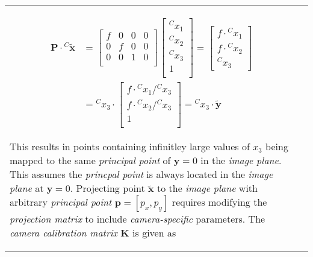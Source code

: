 \begin{longtable}{l p{12cm} }
{\begin{itemize}
\begin{itemize}
 
\begin{equation*}
\begin{split}
\mathbf{P}\cdot{^{C}\mathbf{\tilde{x}}}&=
\begin{bmatrix}
f & 0 & 0 & 0\\
0 & f & 0 & 0\\
0 & 0 & 1 & 0\\
\end{bmatrix}\left[\begin{array}{c}{^Cx_1}\\{^Cx_2}\\{^Cx_3}\\1\\\end{array}\right]
=\left[\begin{array}{c}
f\cdot {^Cx_1}\\
f\cdot {^Cx_2}\\
{^Cx_3}
\end{array}\right]\\
&=
{^Cx_3}\cdot\begin{bmatrix}
f\cdot{^Cx_1}/{^Cx_3}\\
f\cdot{^Cx_2}/{^Cx_3}\\
1\\
\end{bmatrix}
={^Cx_3}\cdot\mathbf{\tilde{y}}
\end{split}
\end{equation*} 

This results in points containing infinitley large values of $x_3$ being mapped to the same \textit{principal point} of $\mathbf{y}=0$ in the \textit{image plane}. This assumes the \textit{princpal point} is always located in the \textit{image plane} at $\mathbf{y}=0$. Projecting point $\mathbf{\tilde{x}}$ to the \textit{image plane} with arbitrary \textit{principal point} $\mathbf{p}=[p_x,p_y]$ requires modifying the \textit{projection matrix} to include \textit{camera-specific} parameters. The \textit{camera calibration matrix} $\mathbf{K}$ is given as
 

\end{itemize}
\end{itemize}}
\end{longtable}
